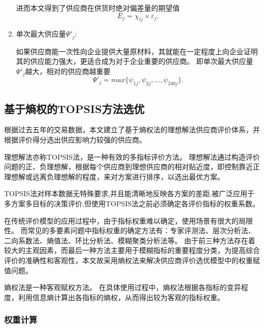 \begin{enumerate}
进而本文得到了供应商在供货时绝对偏差量的期望值
\begin{equation}
    E_j=\chi_{ij} \times \varepsilon_j.
\end{equation}

\item 单次最大供应量$\Psi'_j$:

如果供应商能一次性向企业提供大量原材料，其就能在一定程度上向企业证明其的供应能力强大，更适合成为对于企业重要的供应商。
即单次最大供应量$\Psi'_j$越大，相对的供应商越重要
\begin{equation}
    \Psi'_j=max \{ \psi_{1j},\psi_{2j},\dots,\psi_{240j} \}.
\end{equation}

\end{enumerate}

\subsection{基于熵权的TOPSIS方法选优}
\label{选优}

根据过去五年的交易数据，本文建立了基于熵权法的理想解法供应商评价体系，并根据评价得分选出供应影响力较强的供应商。

理想解法亦称TOPSIS法，是一种有效的多指标评价方法。
理想解法通过构造评价问题的正、负理想解，根据每个供应商到理想供应商的相对贴近度，即控制靠近正理想解或远离负理想解的程度，来对方案进行排序，以选出最优方案。

TOPSIS法对样本数据无特殊要求,并且能清晰地反映各方案的差距,被广泛应用于多方案多目标的决策评价\cite{金王莉2018基于熵权},但使用TOPSIS法之前必须确定各评价指标的权重系数。

在传统评价模型的应用过程中，由于指标权重难以确定，使用场景有很大的局限性。
而常见的多要素问题中指标权重的确定方法有：专家评测法、层次分析法、二向系数法、熵值法、环比分析法、模糊聚类分析法等。
由于前三种方法存在着较大的主观因素，而最后一种方法主要用于模糊指标的重要程度分类，为提高综合评价的准确性和客观性，本文故采用熵权法来解决供应商评价选优模型中的权重赋值问题\cite{供应链}。


熵权法是一种客观赋权方法。
在具体使用过程中，熵权法根据各指标的变异程度，利用信息熵计算出各指标的熵权，从而得出较为客观的指标权重。


\subsubsection{权重计算}

